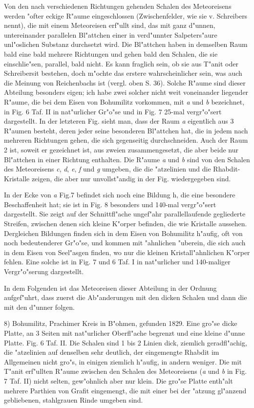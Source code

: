 \documentclass[a4paper, 11pt, oneside]{article}
\begin{document}
Von den nach verschiedenen Richtungen gehenden Schalen des Meteoreisens werden "ofter eckige R"aume eingeschlossen (Zwischenfelder, wie sie v. Schreibers nennt), die mit einem Meteoreisen erf"ullt sind, das mit ganz d"unnen, untereinander parallelen Bl"attchen einer in verd"unnter Salpeters"aure unl"oslichen Substanz durchsetzt wird. Die Bl"attchen haben in demselben Raum bald eine bald mehrere Richtungen und gehen bald den Schalen, die sie einschlie"sen, parallel, bald nicht. Es kann fraglich sein, ob sie aus T"anit oder Schreibersit bestehen, doch m"ochte das erstere wahrscheinlicher sein, was auch die Meinung von Reichenbachs ist (vergl. oben S. 36). Solche R"aume sind dieser Abteilung besonders eigen; ich habe zwei solcher nicht weit voneinander liegender R"aume, die bei dem Eisen von Bohumilitz vorkommen, mit \emph{a} und \emph{b} bezeichnet, in Fig. 6 Taf. II in nat"urlicher Gr"o"se und in Fig. 7 25-mal vergr"o"sert dargestellt. In der letzteren Fig. sieht man, dass der Raum \emph{a} eigentlich aus 3 R"aumen besteht, deren jeder seine besonderen Bl"attchen hat, die in jedem nach mehreren Richtungen gehen, die sich gegenseitig durchschneiden. Auch der Raum 2 ist, soweit er gezeichnet ist, aus zweien zusammengesetzt, die aber beide nur Bl"attchen in einer Richtung enthalten. Die R"aume \emph{a} und \emph{b} sind von den Schalen des Meteoreisens \emph{c}, \emph{d}, \emph{e}, \emph{f} und \emph{g} umgeben, die die "atzelinien und die Rhabdit-Kristalle zeigen, die aber nur unvollst"andig in der Fig. wiedergegeben sind.

In der Ecke von \emph{a} Fig.7 befindet sich noch eine Bildung h, die eine besondere Beschaffenheit hat; sie ist in Fig. 8 besonders und 140-mal vergr"o"sert dargestellt. Sie zeigt auf der Schnittfl"ache ungef"ahr parallellaufende gegliederte Streifen, zwischen denen sich kleine K"orper befinden, die wie Kristalle aussehen. Dergleichen Bildungen finden sich in dem Eisen von Bohumilitz h"aufig, oft von noch bedeutenderer Gr"o"se, und kommen mit "ahnlichen "uberein, die sich auch in dem Eisen von Seel"asgen finden, wo nur die kleinen Kristall"ahnlichen K"orper fehlen. Eine solche ist in Fig. 7 und 6 Taf. I in nat"urlicher und 140-maliger Vergr"o"serung dargestellt.

In dem Folgenden ist das Meteoreisen dieser Abteilung in der Ordnung aufgef"uhrt, dass zuerst die Ab"anderungen mit den dicken Schalen und dann die mit den d"unner folgen.

8) Bohumilitz, Prachimer Kreis in B"ohmen, gefunden 1829. Eine gro"se dicke Platte, an 3 Seiten mit nat"urlicher Oberfl"ache begrenzt und eine kleine d"unne Platte. Fig. 6 Taf. II. Die Schalen sind 1 bis 2 Linien dick, ziemlich geradfl"achig, die "atzelinien auf denselben sehr deutlich, der eingemengte Rhabdit im Allgemeinen nicht gro"s, in einigen ziemlich h"aufig, in andern weniger. Die mit T"anit erf"ullten R"aume zwischen den Schalen des Meteoreisens (\emph{a} und \emph{b} in Fig. 7 Taf. II) nicht selten, gew"ohnlich aber nur klein. Die gro"se Platte enth"alt mehrere Parthien von Grafit eingemengt, die mit einer bei der "atzung gl"anzend gebliebenen, stahlgrauen Rinde umgeben sind.
\end{document}
